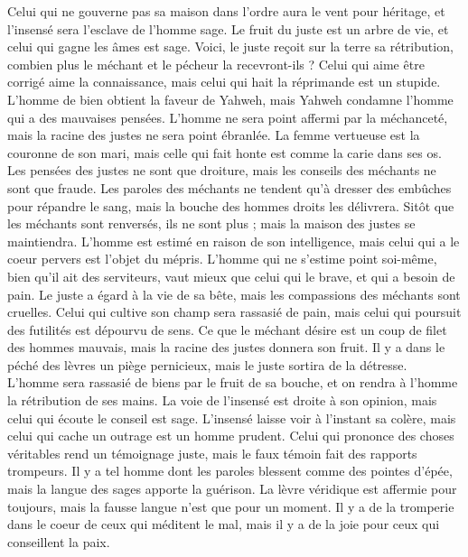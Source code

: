 \begin{multicols}{2}
Celui qui ne gouverne pas sa maison dans l’ordre aura le vent pour héritage, et l’insensé sera l’esclave de l’homme sage.
Le fruit du juste est un arbre de vie, et celui qui gagne les âmes est sage.
Voici, le juste reçoit sur la terre sa rétribution, combien plus le méchant et le pécheur la recevront-ils ?
\VerseOne{}Celui qui aime être corrigé aime la connaissance, mais celui qui hait la réprimande est un stupide.
L'homme de bien obtient la faveur de Yahweh, mais Yahweh condamne l'homme qui a des mauvaises pensées.
L'homme ne sera point affermi par la méchanceté, mais la racine des justes ne sera point ébranlée.
La femme vertueuse est la couronne de son mari, mais celle qui fait honte est comme la carie dans ses os.
Les pensées des justes ne sont que droiture, mais les conseils des méchants ne sont que fraude.
Les paroles des méchants ne tendent qu'à dresser des embûches pour répandre le sang, mais la bouche des hommes droits les délivrera.
Sitôt que les méchants sont renversés, ils ne sont plus ; mais la maison des justes se maintiendra.
L'homme est estimé en raison de son intelligence, mais celui qui a le coeur pervers est l’objet du mépris.
L'homme qui ne s’estime point soi-même, bien qu'il ait des serviteurs, vaut mieux que celui qui le brave, et qui a besoin de pain.
Le juste a égard à la vie de sa bête, mais les compassions des méchants sont cruelles.
Celui qui cultive son champ sera rassasié de pain, mais celui qui poursuit des futilités est dépourvu de sens.
Ce que le méchant désire est un coup de filet des hommes mauvais, mais la racine des justes donnera son fruit.
Il y a dans le péché des lèvres un piège pernicieux, mais le juste sortira de la détresse.
L'homme sera rassasié de biens par le fruit de sa bouche, et on rendra à l'homme la rétribution de ses mains.
La voie de l’insensé est droite à son opinion, mais celui qui écoute le conseil est sage.
L’insensé laisse voir à l’instant sa colère, mais celui qui cache un outrage est un homme prudent.
Celui qui prononce des choses véritables rend un témoignage juste, mais le faux témoin fait des rapports trompeurs.
Il y a tel homme dont les paroles blessent comme des pointes d'épée, mais la langue des sages apporte la guérison.
La lèvre véridique est affermie pour toujours, mais la fausse langue n'est que pour un moment.
Il y a de la tromperie dans le coeur de ceux qui méditent le mal, mais il y a de la joie pour ceux qui conseillent la paix.

\end{multicols}
